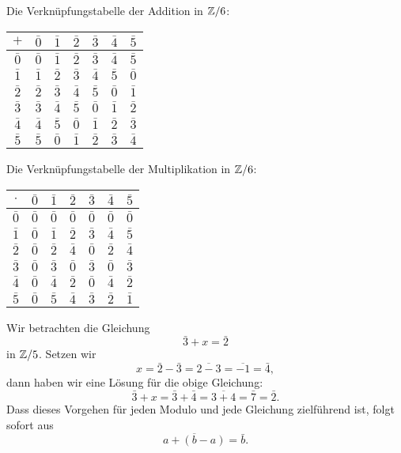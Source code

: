\begin{bsp}
Die Verknüpfungstabelle der Addition in $\mathbb{Z}/6$:
\begin{center}
\begin{tabular}{|c | c | c | c | c | c | c|}
\hline
$+$ & $\bar 0$ & $\bar 1$ & $\bar 2$ &$\bar 3$ &$\bar 4$ &$\bar 5$ \\
\hline
$\bar 0$ & $\bar 0$ & $\bar 1$ & $\bar 2$ &$\bar 3$ &$\bar 4$ &$\bar 5$\\
\hline
$\bar 1$ & $\bar 1$ & $\bar 2$ &$\bar 3$ &$\bar 4$ &$\bar 5$ & $\bar 0$ \\
\hline
$\bar 2$ & $\bar 2$&$\bar 3$ &$\bar 4$ &$\bar 5$ & $\bar 0$ & $\bar 1$\\
\hline
$\bar 3$ &$\bar 3$ &$\bar 4$ &$\bar 5$ & $\bar 0$ & $\bar 1$ & $\bar 2$\\
\hline
$\bar4$ &$\bar 4$ &$\bar 5$ & $\bar 0$ & $\bar 1$ & $\bar 2$ &$\bar 3$\\
\hline
$\bar5$ &$\bar 5$ & $\bar 0$ & $\bar 1$ & $\bar 2$ &$\bar 3$ &$\bar 4$\\
\hline
\end{tabular}
\end{center}
Die Verknüpfungstabelle der Multiplikation in $\mathbb{Z}/6$:
\begin{center}
\begin{tabular}{|c | c | c | c | c | c | c|}
\hline
$\cdot$ & $\bar 0$ & $\bar 1$ & $\bar 2$ &$\bar 3$ &$\bar 4$ &$\bar 5$ \\
\hline
$\bar 0$ & $\bar 0$ & $\bar 0$ & $\bar 0$ &$\bar 0$ &$\bar 0$ &$\bar 0$\\
\hline
$\bar 1$ & $\bar 0$ & $\bar 1$ &$\bar 2$ &$\bar 3$ &$\bar 4$ & $\bar 5$ \\
\hline
$\bar 2$ & $\bar 0$&$\bar 2$ &$\bar 4$ &$\bar 0$ & $\bar 2$ & $\bar 4$\\
\hline
$\bar3$ &$\bar 0$ &$\bar 3$ &$\bar 0$ & $\bar 3$ & $\bar 0$ & $\bar 3$\\
\hline
$\bar4$ &$\bar0$ &$\bar 4$ & $\bar 2$ & $\bar 0$ & $\bar 4$ &$\bar 2$\\
\hline
$\bar 5$ &$\bar 0$ & $\bar 5$ & $\bar 4$ & $\bar 3$ &$\bar 2$ &$\bar 1$\\
\hline
\end{tabular}
\end{center}
\end{bsp}

\begin{rk}
Wir betrachten die Gleichung
\[
\bar 3+x=\bar 2
\]
in $\mathbb{Z}/5$. Setzen wir
\[
x=\bar 2-\bar 3=\overline{2-3}=\overline{-1}=\bar 4,
\]
dann haben wir eine Lösung für die obige Gleichung:
\[
\bar 3+x=\bar 3+\bar 4=\overline{3+4}=\bar 7=\bar 2.
\]
Dass dieses Vorgehen für jeden Modulo und jede Gleichung zielführend ist, folgt sofort aus
\[
\overline{a+(b-a)}=\bar b.
\]
\end{rk}

